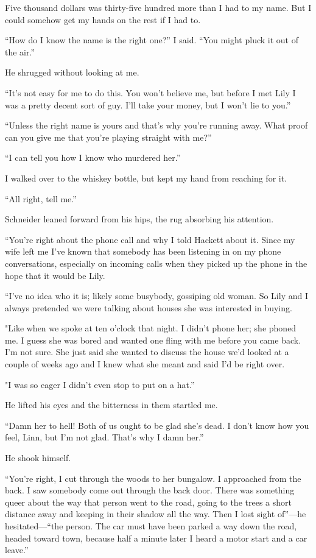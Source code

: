 \documentclass{novel}
\begin{document}
Five thousand dollars was thirty-five hundred more than I had to my name. But I could somehow get my hands on the rest if I had to.

“How do I know the name is the right one?” I said. “You might pluck it out of the air.”

He shrugged without looking at me.

“It’s not easy for me to do this. You won’t believe me, but before I met Lily I was a pretty decent sort of guy. I’ll take your money, but I won’t lie to you.”

“Unless the right name is yours and that’s why you’re running away. What proof can you give me that you’re playing straight with me?”

“I can tell you how I know who murdered her.”

I walked over to the whiskey bottle, but kept my hand from reaching for it.

“All right, tell me.”

Schneider leaned forward from his hips, the rug absorbing his attention.

“You’re right about the phone call and why I told Hackett about it. Since my wife left me I’ve known that somebody has been listening in on my phone conversations, especially on incoming calls when they picked up the phone in the hope that it would be Lily. 

“I’ve no idea who it is; likely some busybody, gossiping old woman. So Lily and I always pretended we were talking about houses she was interested in buying.

"Like when we spoke at ten o’clock that night. I didn’t phone her; she phoned me. I guess she was bored and wanted one fling with me before you came back. I’m not sure. She just said she wanted to discuss the house we’d looked at a couple of weeks ago and I knew what she meant and said I’d be right over.

"I was so eager I didn’t even stop to put on a hat.”

He lifted his eyes and the bitterness in them startled me.

“Damn her to hell! Both of us ought to be glad she’s dead. I don’t know how you feel, Linn, but I’m not glad. That’s why I damn her.”

He shook himself.

“You’re right, I cut through the woods to her bungalow. I approached from the back. I saw somebody come out through the back door. There was something queer about the way that person went to the road, going to the trees a short distance away and keeping in their shadow all the way. Then I lost sight of”—he hesitated—“the person. The car must have been parked a way down the road, headed toward town, because half a minute later I heard a motor start and a car leave.”
\end{document}
